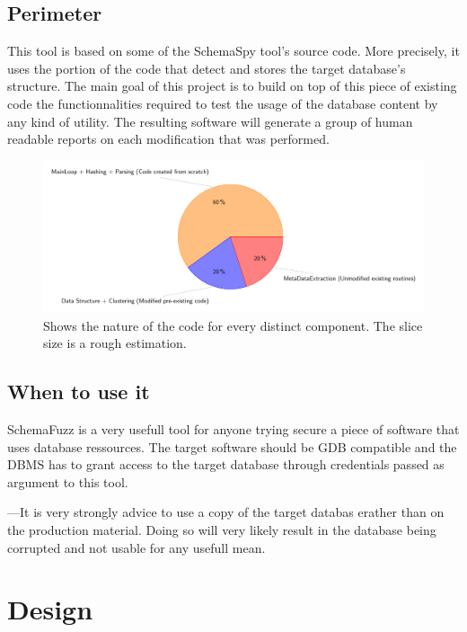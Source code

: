 \documentclass{article}
\begin{document}
\begin{empfile}
		\subsection{Perimeter}
This tool is based on some of the SchemaSpy tool's source code. More precisely, it uses the portion of the code that detect and stores the target database's structure.
The main goal of this project is to build on top of this piece of existing code the functionnalities required to test the usage of the database content by any kind of utility.  		
The resulting software will generate a group of human readable reports on each modification that was performed.		
		\begin{figure} [htbp]
		\centering
		\includegraphics[scale=1]{codeOriginDiagram.pdf}
		\caption{Shows the nature of the code for every distinct component. The slice size is a rough estimation.}
		\end{figure}
		\subsection{When to use it}
SchemaFuzz is a very usefull tool for anyone trying secure a piece of software that uses database ressources. The target software should be GDB compatible and the DBMS has to grant access to the target database through credentials passed as argument to this tool.

---It is very strongly advice to use a copy of the target databas erather than on the production material. Doing so will very likely result in the database being corrupted and not usable for any usefull mean.

	\section{Design}

\end{empfile}
\end{document}
